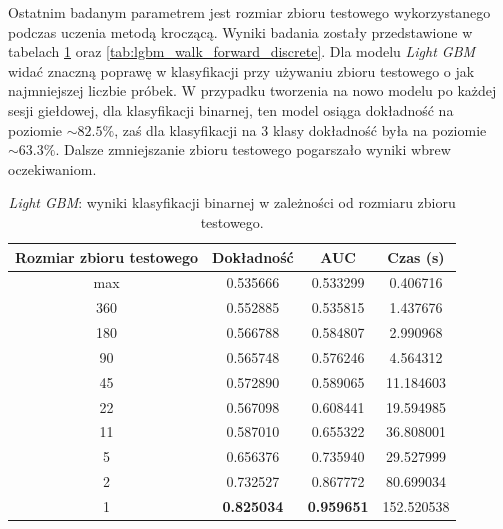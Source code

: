 \documentclass[a4paper, twoside, 11pt, openright]{article}
\begin{document}
Ostatnim badanym parametrem jest rozmiar zbioru testowego wykorzystanego podczas uczenia metodą kroczącą. Wyniki badania zostały przedstawione w tabelach \ref{tab:lgbm_walk_forward_binary} oraz \ref{tab:lgbm_walk_forward_discrete}. Dla modelu \textit{Light GBM} widać znaczną poprawę w klasyfikacji przy używaniu zbioru testowego o jak najmniejszej liczbie próbek. W przypadku tworzenia na nowo modelu po każdej sesji giełdowej, dla klasyfikacji binarnej, ten model osiąga dokładność na poziomie $\sim 82.5\%$, zaś dla klasyfikacji na 3 klasy dokładność była na poziomie $\sim 63.3\%$. Dalsze zmniejszanie zbioru testowego pogarszało wyniki wbrew oczekiwaniom.

\begin{table}[H]
    \centering
    \begin{tabular}{|c|c|c|c|}
    \hline
        \textbf{Rozmiar zbioru testowego} & \textbf{Dokładność} & \textbf{AUC} & \textbf{Czas (s)} \\ \hline
max   						  & 0.535666 &  0.533299 &  0.406716 \\ \hline
360                         &  0.552885 &  0.535815 &    1.437676 \\ \hline
180                        &  0.566788 &  0.584807 &    2.990968 \\ \hline
90                         &  0.565748 &  0.576246 &    4.564312 \\ \hline
45                         &  0.572890 &  0.589065 &   11.184603 \\ \hline
22                          &  0.567098 &  0.608441 &   19.594985 \\ \hline
11                          &  0.587010 &  0.655322 &   36.808001 \\ \hline
5                           &  0.656376 &  0.735940 &   29.527999 \\ \hline
2                           &  0.732527 &  0.867772 &   80.699034 \\ \hline
1                           &  \textbf{0.825034} &  \textbf{0.959651} &  152.520538 \\ \hline

    \end{tabular}
    \caption{\textit{Light GBM}: wyniki klasyfikacji binarnej w zależności od rozmiaru zbioru testowego.}
    \label{tab:lgbm_walk_forward_binary}
\end{table}
\end{document}
